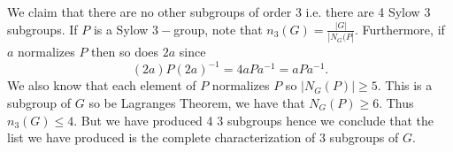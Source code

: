 \documentclass[letterpaper]{article}
\begin{document}
We claim that there are no other subgroups of order 3 i.e. there are 4 Sylow $3$ subgroups. If $P$ is a Sylow $3-$group, note that $n_3(G) = \frac{|G|}{|N_G(P|}$. Furthermore, if $a$ normalizes $P$ then so does $2a$ since $$(2a)P (2a)^{-1} = 4aPa^{-1} = aPa^{-1}.$$ We also know that each element of $P$ normalizes $P$ so $|N_G(P)| \geq 5$. This is a subgroup of $G$ so be Lagranges Theorem, we have that $N_G(P)\geq 6$. Thus $n_3(G) \leq 4$. But we have produced 4 $3$ subgroups hence we conclude that the list we have produced is the complete characterization of $3$ subgroups of $G$. 
\end{document}

